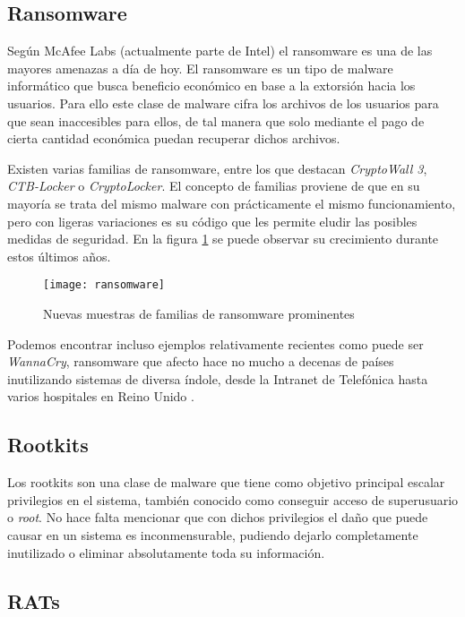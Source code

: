 \subsection{Ransomware}

Según McAfee Labs \cite{mcafee-predictions} (actualmente parte de Intel) el ransomware es una de las mayores amenazas a día de hoy. El ransomware es un tipo de malware informático que busca beneficio económico en base a la extorsión hacia los usuarios. Para ello este clase de malware cifra los archivos de los usuarios para que sean inaccesibles para ellos, de tal manera que solo mediante el pago de cierta cantidad económica puedan recuperar dichos archivos.

Existen varias familias de ransomware, entre los que destacan \emph{CryptoWall 3}, \emph{CTB-Locker} o \emph{CryptoLocker}. El concepto de familias proviene de que en su mayoría se trata del mismo malware con prácticamente el mismo funcionamiento, pero con ligeras variaciones es su código que les permite eludir las posibles medidas de seguridad. En la figura \ref{fig:ransomware} se puede observar su crecimiento durante estos últimos años.

\begin{figure}[H]
	\centering
	\texttt{[image: ransomware]}
	\caption{Nuevas muestras de familias de ransomware prominentes \cite{mcafee-predictions}}
	\label{fig:ransomware}
\end{figure}

Podemos encontrar incluso ejemplos relativamente recientes como puede ser \textit{WannaCry}, ransomware que afecto hace no mucho a decenas de países inutilizando sistemas de diversa índole, desde la Intranet de Telefónica hasta varios hospitales en Reino Unido \cite{wannacry1} \cite{wannacry2}.


\subsection{Rootkits}

Los rootkits son una clase de malware que tiene como objetivo principal escalar privilegios en el sistema, también conocido como conseguir acceso de superusuario o \textit{root}. No hace falta mencionar que con dichos privilegios el daño que puede causar en un sistema es inconmensurable, pudiendo dejarlo completamente inutilizado o eliminar absolutamente toda su información.

\subsection{RATs}

